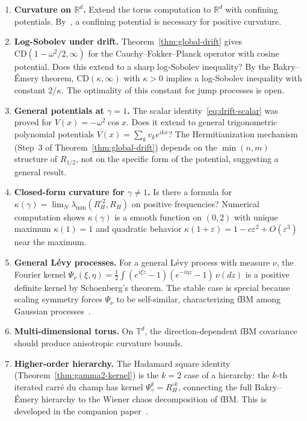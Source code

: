 \documentclass[11pt,a4paper]{article}
\theoremstyle{plain}
\theoremstyle{definition}
\theoremstyle{remark}
\newcommand{\R}{\mathbb{R}}
\newcommand{\T}{\mathbb{T}}
\begin{document}
\begin{enumerate}[label=(\roman*)]
\item \textbf{Curvature on $\R^d$.}
  Extend the torus computation to $\R^d$ with confining potentials.
  By~\cite{SpenerWeberZacher2020}, a confining potential is necessary
  for positive curvature.

\item \textbf{Log-Sobolev under drift.}
  Theorem~\ref{thm:global-drift} gives $\mathrm{CD}(1-\omega^2/2,\infty)$
  for the Cauchy--Fokker--Planck operator with cosine potential.
  Does this extend to a sharp log-Sobolev inequality?
  By the Bakry--\'Emery theorem, $\mathrm{CD}(\kappa,\infty)$ with
  $\kappa > 0$ implies a log-Sobolev inequality with constant $2/\kappa$.
  The optimality of this constant for jump processes is open.

\item \textbf{General potentials at $\gamma = 1$.}
  The scalar identity~\eqref{eq:drift-scalar} was proved for
  $V(x) = -\omega^2\cos x$.  Does it extend to general trigonometric
  polynomial potentials $V(x) = \sum_k v_k e^{ikx}$?
  The Hermitianization mechanism (Step~3 of Theorem~\ref{thm:global-drift})
  depends on the $\min(n,m)$ structure of $R_{1/2}$, not on the
  specific form of the potential, suggesting a general result.

\item \textbf{Closed-form curvature for $\gamma \neq 1$.}
  Is there a formula for
  $\kappa(\gamma) = \lim_N \lambda_{\min}(R_H^{\circ 2}, R_H)$
  on positive frequencies? Numerical computation shows
  $\kappa(\gamma)$ is a smooth function on $(0,2)$ with
  unique maximum $\kappa(1) = 1$ and quadratic behavior
  $\kappa(1+\varepsilon) = 1 - c\varepsilon^2 + O(\varepsilon^3)$
  near the maximum.

\item \textbf{General L\'evy processes.}
  For a general L\'evy process with measure $\nu$, the
  Fourier kernel
  $\Psi_\nu(\xi,\eta) = \frac{1}{2}\int (e^{i\xi z}-1)(e^{-i\eta z}-1)\,
  \nu(dz)$ is a positive definite kernel by Schoenberg's theorem.
  The stable case is special because scaling symmetry forces
  $\Psi_\nu$ to be self-similar, characterizing fBM among Gaussian
  processes~\cite{Mishura2008}.

\item \textbf{Multi-dimensional torus.}
  On $\T^d$, the direction-dependent fBM covariance should produce
  anisotropic curvature bounds.

\item \textbf{Higher-order hierarchy.}
  The Hadamard square identity (Theorem~\ref{thm:gamma2-kernel})
  is the $k = 2$ case of a hierarchy:
  the $k$-th iterated carr\'e du champ has kernel $\Psi_\gamma^k
  = R_H^{\circ k}$, connecting the full Bakry--\'Emery hierarchy
  to the Wiener chaos decomposition of fBM.
  This is developed in the companion paper~\cite{Fontes2026c}.
\end{enumerate}
\end{document}
